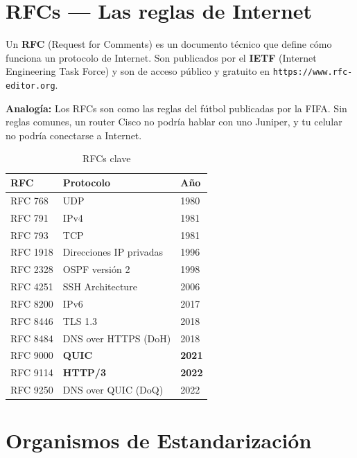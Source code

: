 \section{ RFCs --- Las reglas de Internet}

\begin{concepto}
Un \textbf{RFC} (Request for Comments) es un documento técnico que define cómo
funciona un protocolo de Internet. Son publicados por el \textbf{IETF}
(Internet Engineering Task Force) y son de acceso público y gratuito en
\texttt{https://www.rfc-editor.org}.

 \textbf{Analogía:} Los RFCs son como las reglas del fútbol
publicadas por la FIFA. Sin reglas comunes, un router Cisco no podría
hablar con uno Juniper, y tu celular no podría conectarse a Internet.
\end{concepto}

\begin{table}[h!]
\centering
\renewcommand{\arraystretch}{1.3}
\begin{tabular}{lll}
\toprule
\textbf{RFC} & \textbf{Protocolo} & \textbf{Año} \\
\midrule
RFC 768  & UDP                           & 1980 \\
RFC 791  & IPv4                          & 1981 \\
RFC 793  & TCP                           & 1981 \\
RFC 1918 & Direcciones IP privadas       & 1996 \\
RFC 2328 & OSPF versión 2                & 1998 \\
RFC 4251 & SSH Architecture              & 2006 \\
RFC 8200 & IPv6                          & 2017 \\
RFC 8446 & TLS 1.3                       & 2018 \\
RFC 8484 & DNS over HTTPS (DoH)          & 2018 \\
RFC 9000 & \textbf{QUIC}                 & \textbf{2021} \\
RFC 9114 & \textbf{HTTP/3}               & \textbf{2022} \\
RFC 9250 & DNS over QUIC (DoQ)           & 2022 \\
\bottomrule
\end{tabular}
\caption{RFCs clave}
\end{table}

\section{ Organismos de Estandarización}


